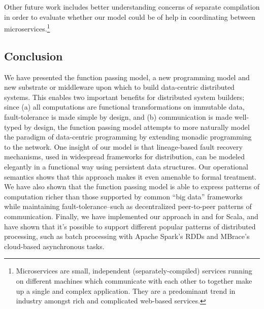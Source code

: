 \documentclass{jfp1}
\begin{document}
Other future work includes better understanding concerns of separate compilation
in order to evaluate whether our model could be of help in coordinating between
microservices.\footnote{Microservices are small, independent
(separately-compiled) services running on different machines which communicate
with each other to together make up a single and complex application. They are a
predominant trend in industry amongst rich and complicated web-based services.}

\subsection{Conclusion}

We have presented the function passing model, a new programming model and new
substrate or middleware upon which to build data-centric distributed systems.
This enables two important benefits for distributed system builders; since (a)
all computations are functional transformations on immutable data,
fault-tolerance is made simple by design, and (b) communication is made
well-typed by design, the function passing model attempts to more naturally
model the paradigm of data-centric programming by extending monadic programming
to the network. One insight of our model is that lineage-based fault recovery
mechanisms, used in widespread frameworks for distribution, can be modeled
elegantly in a functional way using persistent data structures. Our operational
semantics shows that this approach makes it even amenable to formal treatment.
We have also shown that the function passing model is able to express patterns
of computation richer than those supported by common ``big data'' frameworks
while maintaining fault-tolerance--such as decentralized peer-to-peer patterns
of communication. Finally, we have implemented our approach in and for Scala,
and have shown that it's possible to support different popular patterns of
distributed processing, such as  batch processing with Apache Spark's RDDs and
MBrace's cloud-based asynchronous tasks.
\end{document}
